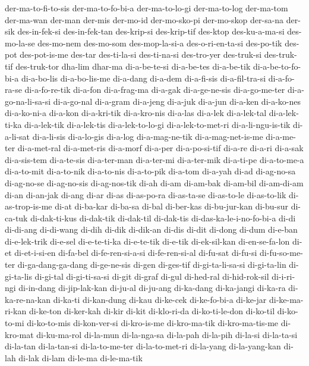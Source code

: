 {der-ma-to-fi-to-sis der-ma-to-fo-bi-a der-ma-to-lo-gi der-ma-to-log
der-ma-tom der-ma-wan der-man der-mis der-mo-id der-mo-sko-pi der-mo-skop
der-sa-na der-sik des-in-fek-si des-in-fek-tan des-krip-si des-krip-tif
des-ktop des-ku-a-ma-si des-mo-la-se des-mo-nem des-mo-som des-mop-la-si-a
des-o-ri-en-ta-si des-po-tik des-pot des-pot-is-me des-tar des-ti-la-si
des-ti-na-si des-tro-yer des-truk-si des-truk-tif des-truk-tor dha-lim
dhar-ma di-a-be-te-si di-a-be-tes di-a-be-tik di-a-be-to-fo-bi-a
di-a-bo-lis di-a-bo-lis-me di-a-dang di-a-dem di-a-fi-sis di-a-fil-tra-si
di-a-fo-ra-se di-a-fo-re-tik di-a-fon di-a-frag-ma di-a-gak di-a-ge-ne-sis
di-a-go-me-ter di-a-go-na-li-sa-si di-a-go-nal di-a-gram di-a-jeng
di-a-juk di-a-jun di-a-ken di-a-ko-nes di-a-ko-ni-a di-a-kon di-a-kri-tik
di-a-kro-nis di-a-las di-a-lek di-a-lek-tal di-a-lek-ti-ka di-a-lek-tik
di-a-lek-tis di-a-lek-to-lo-gi di-a-lek-to-met-ri di-a-li-ngu-is-tik
di-a-li-sat di-a-li-sis di-a-lo-gis di-a-log di-a-mag-ne-tik
di-a-mag-net-is-me di-a-me-ter di-a-met-ral di-a-met-ris di-a-morf
di-a-per di-a-po-si-tif di-a-re di-a-ri di-a-sak di-a-sis-tem di-a-te-sis
di-a-ter-man di-a-ter-mi di-a-ter-mik di-a-ti-pe di-a-to-me-a di-a-to-mit
di-a-to-nik di-a-to-nis di-a-to-pik di-a-tom di-a-yah di-ad di-ag-no-sa
di-ag-no-se di-ag-no-sis di-ag-nos-tik di-ah di-am di-am-bak di-am-bil
di-am-di-am di-an di-an-jak di-ang di-ar di-as di-as-po-ra di-as-ta-se
di-as-to-le di-as-to-lik di-as-trop-is-me di-at di-ba-kar di-ba-sa di-bal
di-ber-kas di-bu-jur-kan di-bu-sur di-ca-tuk di-dak-ti-kus di-dak-tik
di-dak-til di-dak-tis di-das-ka-le-i-no-fo-bi-a di-di di-di-ang di-di-wang
di-dih di-dik di-dik-an di-dis di-dit di-dong di-dum di-e-ban
di-e-lek-trik di-e-sel di-e-te-ti-ka di-e-te-tik di-e-tik di-ek-sil-kan
di-en-se-fa-lon di-et di-et-i-si-en di-fa-bel di-fe-ren-si-a-si
di-fe-ren-si-al di-fu-sat di-fu-si di-fu-so-me-ter di-ga-dang-ga-dang
di-ge-ne-sis di-gen di-ges-tif di-gi-ta-li-sa-si di-gi-ta-lin di-gi-ta-lis
di-gi-tal di-gi-ti-sa-si di-git di-graf di-gul di-hed-ral di-hid-rok-sil
di-i-ri-ngi di-in-dang di-jip-lak-kan di-ju-al di-ju-ang di-ka-dang
di-ka-jangi di-ka-ra di-ka-re-na-kan di-ka-ti di-kan-dung di-kau di-ke-cek
di-ke-fo-bi-a di-ke-jar di-ke-ma-ri-kan di-ke-ton di-ker-kah di-kir di-kit
di-klo-ri-da di-ko-ti-le-don di-ko-til di-ko-to-mi di-ko-to-mis
di-kon-ver-si di-kro-is-me di-kro-ma-tik di-kro-ma-tis-me di-kro-mat
di-ku-ma-rol di-la-mun di-la-nga-sa di-la-pah di-la-pih di-la-si
di-la-ta-si di-la-tan di-la-tan-si di-la-to-me-ter di-la-to-met-ri
di-la-yang di-la-yang-kan di-lah di-lak di-lam di-le-ma di-le-ma-tik
}
